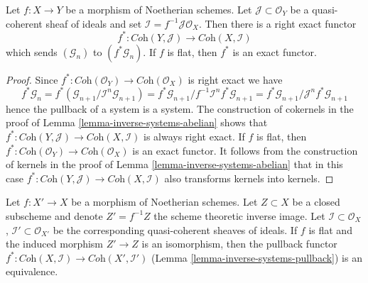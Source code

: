 \begin{lemma}
\label{lemma-inverse-systems-pullback}
Let $f : X \to Y$ be a morphism of Noetherian schemes.
Let $\mathcal{J} \subset \mathcal{O}_Y$ be a quasi-coherent sheaf
of ideals and set $\mathcal{I} = f^{-1}\mathcal{J} \mathcal{O}_X$.
Then there is a right exact functor
$$
f^* : \textit{Coh}(Y, \mathcal{J}) \longrightarrow \textit{Coh}(X, \mathcal{I})
$$
which sends $(\mathcal{G}_n)$ to $(f^*\mathcal{G}_n)$. If $f$ is flat,
then $f^*$ is an exact functor.
\end{lemma}

\begin{proof}
Since $f^* : \textit{Coh}(\mathcal{O}_Y) \to \textit{Coh}(\mathcal{O}_X)$
is right exact we have
$$
f^*\mathcal{G}_n =
f^*(\mathcal{G}_{n + 1}/\mathcal{I}^n\mathcal{G}_{n + 1}) =
f^*\mathcal{G}_{n + 1}/f^{-1}\mathcal{I}^nf^*\mathcal{G}_{n + 1} =
f^*\mathcal{G}_{n + 1}/\mathcal{J}^nf^*\mathcal{G}_{n + 1}
$$
hence the pullback of a system is a system. The construction of
cokernels in the proof of Lemma \ref{lemma-inverse-systems-abelian}
shows that
$f^* : \textit{Coh}(Y, \mathcal{J}) \to \textit{Coh}(X, \mathcal{I})$
is always right exact. If $f$ is flat, then
$f^* : \textit{Coh}(\mathcal{O}_Y) \to \textit{Coh}(\mathcal{O}_X)$
is an exact functor. It follows from the construction of kernels
in the proof of Lemma \ref{lemma-inverse-systems-abelian}
that in this case
$f^* : \textit{Coh}(Y, \mathcal{J}) \to \textit{Coh}(X, \mathcal{I})$
also transforms kernels into kernels.
\end{proof}

\begin{lemma}
\label{lemma-inverse-systems-pullback-equivalence}
Let $f : X' \to X$ be a morphism of Noetherian schemes. Let $Z \subset X$
be a closed subscheme and denote $Z' = f^{-1}Z$ the scheme theoretic
inverse image. Let $\mathcal{I} \subset \mathcal{O}_X$,
$\mathcal{I}' \subset \mathcal{O}_{X'}$ be the corresponding
quasi-coherent sheaves of ideals.
If $f$ is flat and the induced morphism $Z' \to Z$
is an isomorphism, then the pullback functor
$f^* : \textit{Coh}(X, \mathcal{I}) \to \textit{Coh}(X', \mathcal{I}')$
(Lemma \ref{lemma-inverse-systems-pullback})
is an equivalence.
\end{lemma}

